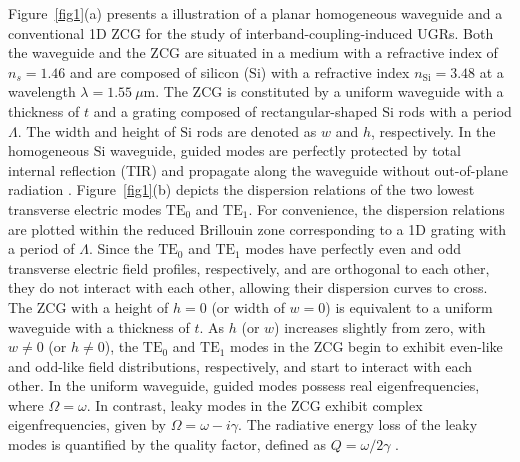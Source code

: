 \documentclass[%
 reprint,
superscriptaddress,
 amsmath,amssymb, aps,
]{revtex4-1}
\begin{document}
Figure~\ref{fig1}(a) presents a illustration of a planar homogeneous waveguide and a conventional 1D ZCG for the study of interband-coupling-induced UGRs. Both the waveguide and the ZCG are situated in a medium with a refractive index of $n_s=1.46$ and are composed of silicon ($\mathrm{Si}$) with a refractive index $n_\mathrm{Si}=3.48$ at a wavelength $\lambda =1.55~\mu \mathrm{m}$. The ZCG is constituted by a uniform waveguide with a thickness of $t$ and a grating composed of rectangular-shaped $\mathrm{Si}$ rods with a period $\Lambda$. The width and height of $\mathrm{Si}$ rods are denoted as $w$ and $h$, respectively. In the homogeneous $\mathrm{Si}$ waveguide, guided modes are perfectly protected by total internal reflection (TIR) and propagate along the waveguide without out-of-plane radiation \cite{Agrawal2004}. Figure~\ref{fig1}(b) depicts the dispersion relations of the two lowest transverse electric modes $\mathrm{TE}_{0}$ and $\mathrm{TE}_{1}$. For convenience, the dispersion relations are plotted within the reduced Brillouin zone corresponding to a 1D grating with a period of $\Lambda$. Since the $\mathrm{TE}_{0}$ and $\mathrm{TE}_{1}$ modes have perfectly even and odd transverse electric field profiles, respectively, and are orthogonal to each other, they do not interact with each other, allowing their dispersion curves to cross. The ZCG with a height of $h=0$ (or width of $w=0$) is equivalent to a uniform waveguide with a thickness of $t$. As $h$ (or $w$) increases slightly from zero, with $w\neq 0$ (or $h\neq 0$), the $\mathrm{TE}_{0}$ and $\mathrm{TE}_{1}$ modes in the ZCG begin to exhibit even-like and odd-like field distributions, respectively, and start to interact with each other. In the uniform waveguide, guided modes possess real eigenfrequencies, where $\Omega = \omega$. In contrast, leaky modes in the ZCG exhibit complex eigenfrequencies, given by $\Omega = \omega - i \gamma$. The radiative energy loss of the leaky modes is quantified by the quality factor, defined as $Q = \omega / 2\gamma$ \cite{Joannopoulos2008}. 
\end{document}
